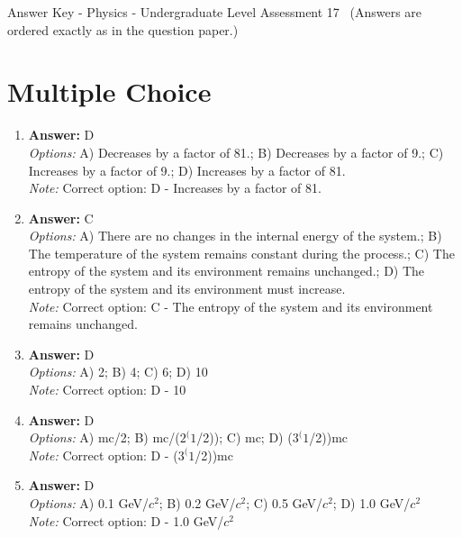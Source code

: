 \documentclass[12pt]{article}
\begin{document}
\begin{center}
Answer Key - Physics - Undergraduate Level Assessment 17 \
\small (Answers are ordered exactly as in the question paper.)
\end{center}

\section*{Multiple Choice}
\begin{enumerate}[label=\arabic*.]
\item \textbf{Answer:} D
\\ \textit{Options:} A) Decreases by a factor of 81.; B) Decreases by a factor of 9.; C) Increases by a factor of 9.; D) Increases by a factor of 81.
\\ \textit{Note:} Correct option: D - Increases by a factor of 81.
\item \textbf{Answer:} C
\\ \textit{Options:} A) There are no changes in the internal energy of the system.; B) The temperature of the system remains constant during the process.; C) The entropy of the system and its environment remains unchanged.; D) The entropy of the system and its environment must increase.
\\ \textit{Note:} Correct option: C - The entropy of the system and its environment remains unchanged.
\item \textbf{Answer:} D
\\ \textit{Options:} A) 2; B) 4; C) 6; D) 10
\\ \textit{Note:} Correct option: D - 10
\item \textbf{Answer:} D
\\ \textit{Options:} A) mc/2; B) mc/($2^(1$/2)); C) mc; D) ($3^(1$/2))mc
\\ \textit{Note:} Correct option: D - ($3^(1$/2))mc
\item \textbf{Answer:} D
\\ \textit{Options:} A) 0.1 GeV/$c^2$; B) 0.2 GeV/$c^2$; C) 0.5 GeV/$c^2$; D) 1.0 GeV/$c^2$
\\ \textit{Note:} Correct option: D - 1.0 GeV/$c^2$
\end{enumerate}
\end{document}
